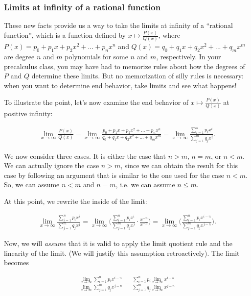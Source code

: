 \documentclass{article}
\begin{document}
\subsubsection*{Limits at infinity of a rational function}

These new facts provide us a way to take the limits at infinity of a ``rational function'', which is a function defined by $x \mapsto \frac{P(x)}{Q(x)}$, where $P(x) = p_0 + p_1 x + p_2 x^2 + ... + p_n x^n$ and $Q(x) = q_0 + q_1 x + q_2 x^2 + ... + q_m x^m$ are degree $n$ and $m$ polynomials for some $n$ and $m$, respectively. In your precalculus class, you may have had to memorize rules about how the degrees of $P$ and $Q$ determine these limits. But no memorization of silly rules is necessary: when you want to determine end behavior, take limits and see what happens!

To illustrate the point, let's now examine the end behavior of $x \mapsto \frac{P(x)}{Q(x)}$ at positive infinity:

\begin{align*}
    \lim_{x \rightarrow \infty} \frac{P(x)}{Q(x)} 
    = \lim_{x \rightarrow \infty} \frac{p_0 + p_1 x + p_2 x^2 + ... + p_n x^n}{q_0 + q_1 x + q_2 x^2 + ... + q_m x^m} 
    = \lim_{x \rightarrow \infty} \frac{\sum_{i = 1}^n p_i x^i}{\sum_{j = 1}^m q_j x^j}.
\end{align*}

We now consider three cases. It is either the case that $n > m$, $n = m$, or $n < m$. We can actually ignore the case $n > m$, since we can obtain the result for this case by following an argument that is similar to the one used for the case $n < m$. So, we can assume $n < m$ and $n = m$, i.e. we can assume $n \leq m$.

At this point, we rewrite the inside of the limit:

\begin{align*}
    \lim_{x \rightarrow \infty} \frac{\sum_{i = 1}^n p_i x^i}{\sum_{j = 1}^m q_j x^j} 
    = \lim_{x \rightarrow \infty} \Big( \frac{\sum_{i = 1}^n p_i x^i}{\sum_{j = 1}^m q_j x^j} \cdot \frac{x^{-n}}{x^{-n}} \Big)
    = \lim_{x \rightarrow \infty} \Big( \frac{\sum_{i = 1}^n p_i x^{i - n}}{\sum_{j = 1}^m q_j x^{j - n}} \Big).
\end{align*}

Now, we will \textit{assume} that it is valid to apply the limit quotient rule and the linearity of the limit. (We will justify this assumption retroactively). The limit becomes

\begin{align*}
    \frac{\lim_{x \rightarrow \infty} \sum_{i = 1}^n p_i x^{i - n}}{\lim_{x \rightarrow \infty} \sum_{j = 1}^m q_j x^{j - n}}
    = \frac{\sum_{i = 1}^n p_i \lim_{x \rightarrow \infty} x^{i - n}}{\sum_{j = 1}^m q_j \lim_{x \rightarrow \infty} x^{j - n}}
\end{align*}
\end{document}
